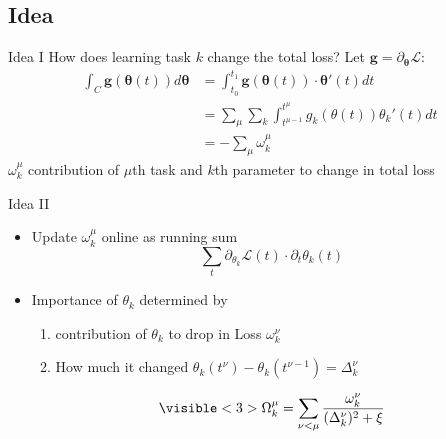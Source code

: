 \documentclass{beamer}
\begin{document}
\subsection{Idea}
\begin{frame}[fragile]{Idea I}
How does learning task $k$ change the total loss? Let $\bm g = \partial_{\bm \theta} \mathcal L$:
\begin{align}
\int_C \bm g(\bm \theta (t)) d \bm \theta& = \int_{t_0}^{t_1} \bm g(\bm \theta(t)) \cdot \bm \theta '(t) dt\\
& = \sum_\mu \sum_k \int_{t^{\mu-1}}^{t^\mu} g_k(\theta(t)) \theta_k'(t) dt \\
& = - \sum_\mu \omega_k^\mu
\end{align}
$\omega_k^\mu $ contribution of $\mu$th task and $k$th parameter to change in total loss

\end{frame}
\begin{frame}{Idea II}
	\begin{itemize}
		\item Update $\omega_k^\mu$ online as running sum $$\sum_{t}\partial_{\theta_k}\mathcal L(t) \cdot \partial_t \theta_k(t)$$
		\item<2-> Importance of $\theta_k$ determined by
		\begin{enumerate}
			\item <2->contribution of $\theta_k$ to drop in Loss $\omega_k^\nu$
			\item<2-> How much it changed $\theta_k(t^\nu) - \theta_k(t^{\nu -1}) = \Delta_k^\nu$
		\end{enumerate}
	\begin{equation}
	\visible<3>{\Omega_k^\mu = \sum_{\nu < \mu} \frac{\omega_k^\nu}{(\Delta_k^\nu)^2 + \xi}}
	\end{equation}
	\end{itemize}
\end{frame}
\end{document}

